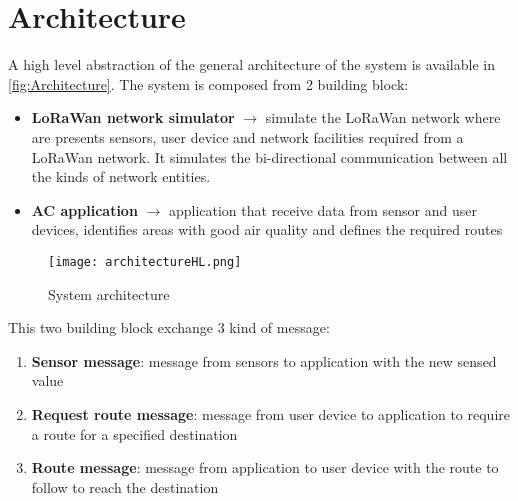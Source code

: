 \chapter{Architecture}
A high level abstraction of the general architecture of the system is available in \autoref{fig:Architecture}.
The system is composed from 2 building block:
\begin{itemize}
    \item \textbf{LoRaWan network simulator} $\rightarrow$ simulate the LoRaWan network where are presents sensors, user device and network facilities required from a LoRaWan network. It simulates the bi-directional communication between all the kinds of network entities.
    \item \textbf{AC application} $\rightarrow$ application that receive data from sensor and user devices, identifies areas with good air quality and defines the required routes
\end{itemize}

\begin{figure}[h]
    \centering
    \texttt{[image: architectureHL.png]}
    \caption{System architecture}
    \label{fig:Architecture}
\end{figure}

This two building block exchange 3 kind of message:
\begin{enumerate}
    \item \textbf{Sensor message}: message from sensors to application with the new sensed value
    \item \textbf{Request route message}: message from user device to application to require a route for a specified destination
    \item \textbf{Route message}: message from application to user device with the route to follow to reach the destination
\end{enumerate}

